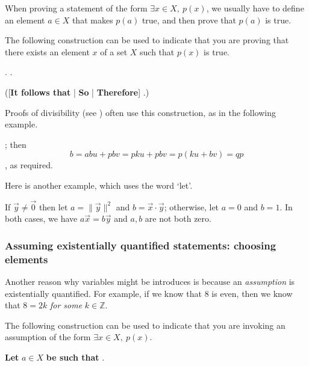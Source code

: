 When proving a statement of the form $\exists x \in X,~ p(x)$, we usually have to define an element $a \in X$ that makes $p(a)$ true, and then prove that $p(a)$ is true.

\begin{vocabulary}
\label{vcbDefiningVariable}
The following construction can be used to indicate that you are proving that there exists an element $x$ of a set $X$ such that $p(x)$ is true.

\begin{vocabtemplate}
 . .

([\textbf{It follows that} | \textbf{So} | \textbf{Therefore}] .)
\end{vocabtemplate}
\end{vocabulary}

Proofs of divisibility (see ) often use this construction, as in the following example.

\begin{extract}
\label{xtrProvingExistsExample}
; then
\[ b = abu+pbv = pku+pbv = p(ku+bv) = qp \]
, as required.
\end{extract}

Here is another example, which uses the word `let'.

\begin{extract}
\label{xtrProvingExistsExampleTwo}
If $\vec y \ne \vec 0$ then let $a=\lVert \vec y \rVert^2$ and $b=\vec x \cdot \vec y$; otherwise, let $a=0$ and $b=1$. In both cases, we have $a \vec x = b \vec y$ and $a,b$ are not both zero.
\end{extract}

\subsubsection*{Assuming existentially quantified statements: choosing elements}

Another reason why variables might be introduces is because an \textit{assumption} is existentially quantified. For example, if we know that $8$ is even, then we know that $8 = 2k$ \textit{for some} $k \in \mathbb{Z}$.

\begin{vocabulary}
\label{vcbAssumingExistential}
The following construction can be used to indicate that you are invoking an assumption of the form $\exists x \in X,~p(x)$.

\begin{vocabtemplate}
\textbf{Let} $a \in X$ \textbf{be such that} .
\end{vocabtemplate}
\end{vocabulary}

